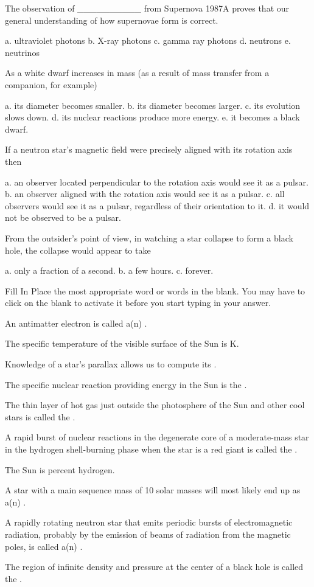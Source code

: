 The observation of __________ from Supernova 1987A proves that our general understanding of how supernovae form is correct.

a. ultraviolet photons
b. X-ray photons
c. gamma ray photons
d. neutrons
e. neutrinos

As a white dwarf increases in mass (as a result of mass transfer from a companion, for example) 

a. its diameter becomes smaller.
b. its diameter becomes larger.
c. its evolution slows down.
d. its nuclear reactions produce more energy.
e. it becomes a black dwarf.

If a neutron star's magnetic field were precisely aligned with its rotation axis then 

a. an observer located perpendicular to the rotation axis would see it as a pulsar.
b. an observer aligned with the rotation axis would see it as a pulsar.
c. all observers would see it as a pulsar, regardless of their orientation to it.
d. it would not be observed to be a pulsar.

From the outsider's point of view, in watching a star collapse to form a black hole, the collapse would appear to take

a. only a fraction of a second.
b. a few hours.
c. forever.

Fill In
Place the most appropriate word or words in the blank. You may have to click on the blank to activate it before you start typing in your answer.
 
An antimatter electron is called a(n) .

The specific temperature of the visible surface of the Sun is K.

Knowledge of a star's parallax allows us to compute its .

The specific nuclear reaction providing energy in the Sun is the .

The thin layer of hot gas just outside the photosphere of the Sun and other cool stars is called the .

A rapid burst of nuclear reactions in the degenerate core of a moderate-mass star in the hydrogen shell-burning phase when the star is a red giant is called the .

The Sun is percent hydrogen.

A star with a main sequence mass of 10 solar masses will most likely end up as a(n) .

A rapidly rotating neutron star that emits periodic bursts of electromagnetic radiation, probably by the emission of beams of radiation from the magnetic poles, is called a(n) .

The region of infinite density and pressure at the center of a black hole is called the .

